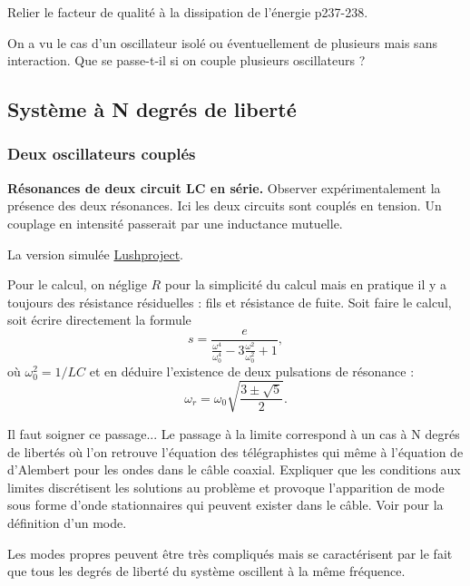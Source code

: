 Relier le facteur de qualité à la dissipation de l'énergie \cite{Faroux1996} p237-238.

\begin{transition}
On a vu le cas d'un oscillateur isolé ou éventuellement de plusieurs mais sans interaction.
Que se passe-t-il si on couple plusieurs oscillateurs ?
\end{transition}

\subsection{Système à N degrés de liberté}

\subsubsection{Deux oscillateurs couplés}

\begin{experience}
\textbf{Résonances de deux circuit LC en série.}
Observer expérimentalement la présence des deux résonances.
Ici les deux circuits sont couplés en tension.
Un couplage en intensité passerait par une inductance mutuelle.

\noindent
La version simulée \href{http://tinyurl.com/ydfkzcyh}{Lushproject}.
\end{experience}

Pour le calcul, on néglige $R$ pour la simplicité du calcul mais en pratique il y a toujours des résistance résiduelles : fils et résistance de fuite.
Soit faire le calcul, soit écrire directement la formule 
\begin{equation}
s = \frac{e}{\frac{\omega^4}{\omega_0^4} - 3\frac{\omega^2}{\omega_0^2} + 1},
\end{equation}
où $\omega_0^2=1/LC$ et en déduire l'existence de deux pulsations de résonance :
\begin{equation}
\omega_r = \omega_0 \sqrt{\frac{3\pm\sqrt{5}}{2}}.
\end{equation}

Il faut soigner ce passage...
Le passage à la limite correspond à un cas à N degrés de libertés où l'on retrouve l'équation des télégraphistes qui même à l'équation de d'Alembert pour les ondes dans le câble coaxial.
Expliquer que les conditions aux limites discrétisent les solutions au problème et provoque l'apparition de mode sous forme d'onde stationnaires qui peuvent exister dans le câble.
Voir \cite{Taillet2018} pour la définition d'un mode.

\begin{remarque}
Les modes propres peuvent être très compliqués mais se caractérisent par le fait que tous les degrés de liberté du système oscillent à la même fréquence.
\end{remarque}

